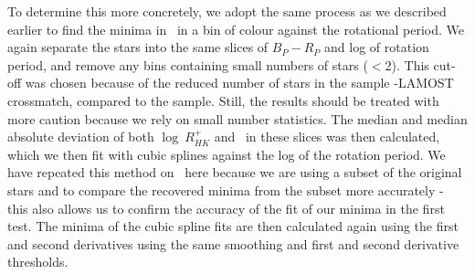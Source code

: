 To determine this more concretely, we adopt the same process as we described earlier to find the minima in \rper{} \ in a bin of colour against the rotational period.
We again separate the stars into the same slices of $B_P-R_P$ and log of rotation period, and remove any bins containing small numbers of stars ($<$2).
This cut-off was chosen because of the reduced number of stars in the sample \kepler{}-LAMOST crossmatch, compared to the \citet{mcquillan_rotation_2014} sample.
 Still, the results should be treated with more caution because we rely on small number statistics.
The median and median absolute deviation of both $\log \ R^{+}_{HK}$ and \rper{} \ in these slices was then calculated, which we then fit with cubic splines against the log of the rotation period.
We have repeated this method on \rper{} \ here because we are using a subset of the original stars and to compare the recovered minima from the subset more accurately - this also allows us to confirm the accuracy of the fit of our minima in the first test.
The minima of the cubic spline fits are then calculated again using the first and second derivatives using the same smoothing and first and second derivative thresholds.

